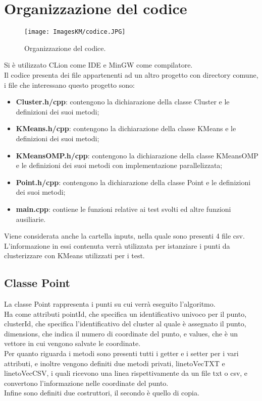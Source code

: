 \documentclass[10pt,twocolumn,letterpaper]{article}
\newcommand{\bit} {\begin{itemize} }
\newcommand{\eit} {\end{itemize} }
\begin{document}
\section{Organizzazione del codice}
\begin{figure}[h]
    \centering
    \texttt{[image: ImagesKM/codice.JPG]}
    \caption{Organizzazione del codice.}
\end{figure}
Si è utilizzato CLion come IDE e MinGW come compilatore.\\
Il codice presenta dei file appartenenti ad un altro progetto con directory comune, i file che interessano questo progetto sono:
\bit
    \item{\textbf{Cluster.h/cpp}: contengono la dichiarazione della classe Cluster e le definizioni dei suoi metodi;}
    \item{\textbf{KMeans.h/cpp}: contengono la dichiarazione della classe KMeans e le definizioni dei suoi metodi;}
    \item{\textbf{KMeansOMP.h/cpp}: contengono la dichiarazione della classe KMeansOMP e le definizioni dei suoi metodi con implementazione parallelizzata;}
    \item{\textbf{Point.h/cpp}: contengono la dichiarazione della classe Point e le definizioni dei suoi metodi;}
    \item{\textbf{main.cpp}: contiene le funzioni relative ai test svolti ed altre funzioni ausiliarie.}
\eit
Viene considerata anche la cartella inputs, nella quale sono presenti 4 file csv. L'informazione in essi contenuta verrà utilizzata per istanziare i punti da clusterizzare con KMeans utilizzati per i test.

\subsection{Classe Point}
La classe Point rappresenta i punti su cui verrà eseguito l'algoritmo.\\
Ha come attributi pointId, che specifica un identificativo univoco per il punto, clusterId, che specifica l'identificativo del cluster al quale è assegnato il punto, dimensions, che indica il numero di coordinate del punto, e values, che è un vettore in cui vengono salvate le coordinate.\\
Per quanto riguarda i metodi sono presenti tutti i getter e i setter per i vari attributi, e inoltre vengono definiti due metodi privati, linetoVecTXT e linetoVecCSV, i quali ricevono una linea rispettivamente da un file txt o csv, e convertono l'informazione nelle coordinate del punto.\\
Infine sono definiti due costruttori, il secondo è quello di copia.
\end{document}

